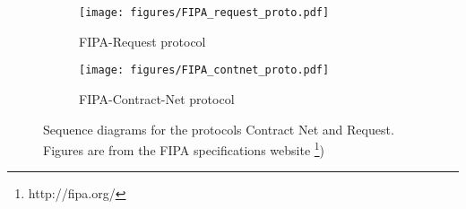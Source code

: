 \begin{figure}[ht]
	\centering
    \begin{subfigure}[b]{0.44\textwidth}
		\centering
		\texttt{[image: figures/FIPA\_request\_proto.pdf]}
		\caption[FIPA-Request protocol]{FIPA-Request protocol}
		\label{fig:FIPA_request_proto}
    \end{subfigure}%
    \begin{subfigure}[b]{0.54\textwidth}
		\centering
		\texttt{[image: figures/FIPA\_contnet\_proto.pdf]}
		\caption[FIPA-Contract-Net protocol]{FIPA-Contract-Net protocol}
		\label{fig:FIPA_contnet_proto}
    \end{subfigure}
    \caption[]{Sequence diagrams for the protocols Contract Net and Request. \\Figures are from the FIPA specifications website \footnote{http://fipa.org/})}
    \label{fig:FIPA_Protocols}
\end{figure}
